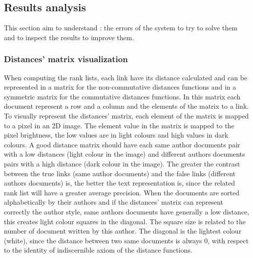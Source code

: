 \subsection{Results analysis}

This section aim to understand : the errors of the system to try to solve them and to inspect the results to improve them.

\subsubsection{Distances' matrix visualization}

When computing the rank lists, each link have its distance calculated and can be represented in a matrix for the non-commutative distances functions and in a symmetric matrix for the commutative distances functions.
In this matrix each document represent a row and a column and the elements of the matrix to a link.
To visually represent the distances' matrix, each element of the matrix is mapped to a pixel in an 2D image.
The element value in the matrix is mapped to the pixel brightness, the low values are in light colours and high values in dark colours.
A good distance matrix should have each same author documents pair with a low distances (light colour in the image) and different authors documents pairs with a high distance (dark colour in the image).
The greater the contrast between the true links (same author documents) and the false links (different authors documents) is, the better the text representation is, since the related rank list will have a greater average precision.
When the documents are sorted alphabetically by their authors and if the distances' matrix can represent correctly the author style, same authors documents have generally a low distance, this creates light colour squares in the diagonal.
The square size is related to the number of document written by this author.
The diagonal is the lightest colour (white), since the distance between two same documents is always 0, with respect to the identity of indiscernible axiom of the distance functions.

